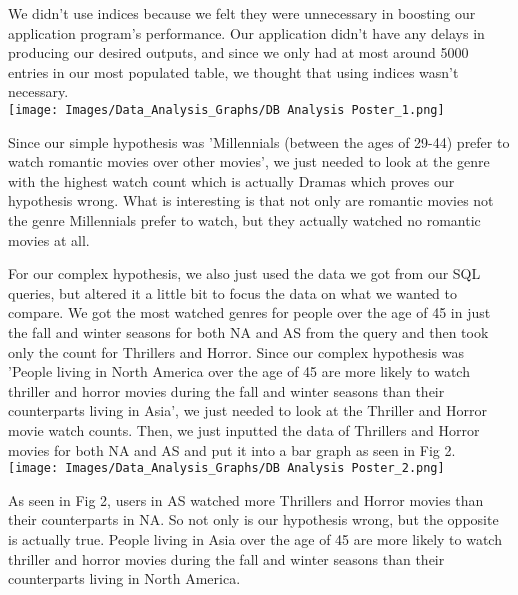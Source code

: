 \documentclass[12pt]{article}
\begin{document}
We didn't use indices because we felt they were unnecessary in boosting our application program’s performance. Our application didn't have any delays in producing our desired outputs, and since we only had at most around 5000 entries in our most populated table, we thought that using indices wasn't necessary.\\

{
    \captionsetup[figure]{labelformat=empty}
    \centering
    \texttt{[image: Images/Data\_Analysis\_Graphs/DB Analysis Poster\_1.png]} \\
    \vspace{15pt} 
}

Since our simple hypothesis was 'Millennials (between the ages of 29-44) prefer to watch romantic movies over other movies', we just needed to look at the genre with the highest watch count which is actually Dramas which proves our hypothesis wrong. What is interesting is that not only are romantic movies not the genre Millennials prefer to watch, but they actually watched no romantic movies at all.

For our complex hypothesis, we also just used the data we got from our SQL queries, but altered it a little bit to focus the data on what we wanted to compare. We got the most watched genres for people over the age of 45 in just the fall and winter seasons for both NA and AS from the query and then took only the count for Thrillers and Horror. Since our complex hypothesis was 'People living in North America over the age of 45 are more likely to watch thriller and horror movies during the fall and winter seasons than their counterparts living in Asia', we just needed to look at the Thriller and Horror movie watch counts. Then, we just inputted the data of Thrillers and Horror movies for both NA and AS and put it into a bar graph as seen in Fig 2.
\\

{
    \captionsetup[figure]{labelformat=empty}
    \centering
    \texttt{[image: Images/Data\_Analysis\_Graphs/DB Analysis Poster\_2.png]} \\
    \vspace{15pt} 
}

As seen in Fig 2, users in AS watched more Thrillers and Horror movies than their counterparts in NA. So not only is our hypothesis wrong, but the opposite is actually true. People living in Asia over the age of 45 are more likely to watch thriller and horror movies during the fall and winter seasons than their counterparts living in North America.
\end{document}
